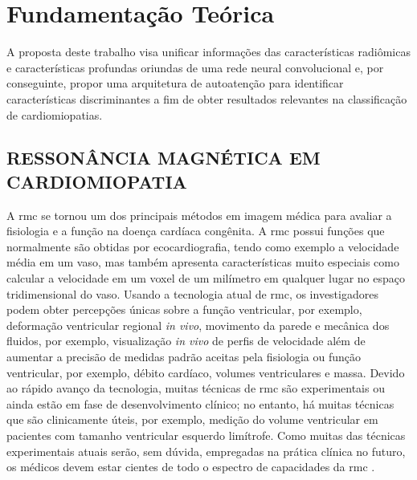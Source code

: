 

\chapter{Fundamentação Teórica}
\label{chap:fundamentacao_teorica}
\vspace{-\baselineskip} %

A proposta deste trabalho visa unificar informações das características radiômicas e características profundas oriundas de uma rede neural convolucional e, por conseguinte, propor uma arquitetura de autoatenção para identificar características discriminantes a fim de obter resultados relevantes na classificação de cardiomiopatias.

\section{RESSONÂNCIA MAGNÉTICA EM CARDIOMIOPATIA}
\label{sec:rmc}

A \gls{rmc} se tornou um dos principais métodos em imagem médica para avaliar a fisiologia e a função na doença cardíaca congênita. A \gls{rmc} possui funções que normalmente são obtidas por ecocardiografia, tendo como exemplo a velocidade média em um vaso, mas também apresenta características muito especiais como calcular a velocidade em um voxel de um milímetro em qualquer lugar no espaço tridimensional do vaso.
Usando a tecnologia atual de \gls{rmc}, os investigadores podem obter percepções únicas sobre a função ventricular, por exemplo, deformação ventricular regional \textit{in vivo}, movimento da parede e mecânica dos fluidos, por exemplo, visualização \textit{in vivo} de perfis de velocidade além de aumentar a precisão de medidas padrão aceitas pela fisiologia ou função ventricular, por exemplo, débito cardíaco, volumes ventriculares e massa. Devido ao rápido avanço da tecnologia, muitas técnicas de \gls{rmc} são experimentais ou ainda estão em fase de desenvolvimento clínico; no entanto, há muitas técnicas que são clinicamente úteis, por exemplo, medição do volume ventricular em pacientes com tamanho ventricular esquerdo limítrofe. Como muitas das técnicas experimentais atuais serão, sem dúvida, empregadas na prática clínica no futuro, os médicos devem estar cientes de todo o espectro de capacidades da \gls{rmc} \cite{fogelAssessmentCardiacFunction2000}.

